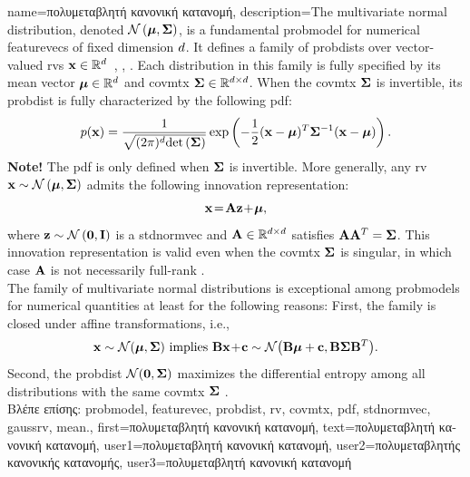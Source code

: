 {name={\foreignlanguage{greek}{πολυμεταβλητή κανονική κατανομή}}, 
	description={The multivariate normal distribution, 
 		denoted $\mathcal{N}\left({\bm \mu},{\bf \Sigma}\right)$, is a fundamental \gls{probmodel} 
 		for numerical \gls{featurevec}s of fixed dimension $d$. 
 		It defines a family of \gls{probdist}s over vector-valued \gls{rv}s
 		${\bf x} \in \mathbb{R}^{d}$~\cite{BertsekasProb}, \cite{GrayProbBook}, \cite{Lapidoth09}. 
 		Each distribution in this family is fully specified by its \gls{mean} vector 
 		${\bm \mu} \in \mathbb{R}^{d}$ and \gls{covmtx} ${\bf \Sigma} \in \mathbb{R}^{d \times d}$. 
 		When the \gls{covmtx} ${\bf \Sigma}$ is invertible, its \gls{probdist} is 
 		fully characterized by the following \gls{pdf}:
 		\[
 		p({\bf x}) = 
 		\frac{1}{\sqrt{(2\pi)^{d} {\rm det}\left( {\bf \Sigma} \right)}} 
 		\exp\left( -\frac{1}{2} 
 		({\bf x} - {\bm \mu})^T {\bf \Sigma}^{-1} 
 		({\bf x} - {\bm \mu}) \right).
 		\]
 		\textbf{Note!} The \gls{pdf} is only defined when ${\bf \Sigma}$ is invertible.
     		More generally, any \gls{rv} ${\bf x} \sim \mathcal{N}\left({\bm \mu},{\bf \Sigma}\right)$ 
     		admits the following innovation representation:
		\[{\bf x} \!=\! {\bf A} {\bf z} \!+\!{\bm \mu},
		\]
		where ${\bf z} \sim \mathcal{N}\left(\mathbf{0},\mathbf{I}\right)$ is a \gls{stdnormvec} 
		and ${\bf A} \in \mathbb{R}^{d \times d}$ satisfies ${\bf A} {\bf A}^T = {\bf \Sigma}$. 
		This innovation representation is valid even when the \gls{covmtx} ${\bf \Sigma}$ is singular, 
		in which case ${\bf A}$ is not necessarily full-rank \cite[Ch. 23]{Lapidoth2017}.\\ 
		The family of multivariate normal distributions is exceptional among \gls{probmodel}s for numerical 
		quantities at least for the following reasons: First, the family is closed under affine transformations, i.e., 
		\[ 
		{\bf x} \sim \mathcal{N}({\bm \mu},{\bf \Sigma}) \mbox{ implies } 
		{\bf B}{\bf x}\!+\!{\bf c} \sim \mathcal{N}\big( {\bf B}{\bm \mu}+{\bf c},{\bf B} {\bf \Sigma} {\bf B}^{T} \big). 
		\]
		Second, the \gls{probdist} $\mathcal{N}(\mathbf{0},{\bf \Sigma})$ maximizes the differential entropy 
		among all distributions with the same \gls{covmtx} ${\bf \Sigma}$ \cite{coverthomas}. \\ 
		\foreignlanguage{greek}{Βλέπε επίσης:} \gls{probmodel}, \gls{featurevec}, \gls{probdist}, \gls{rv}, \gls{covmtx}, \gls{pdf}, \gls{stdnormvec}, \gls{gaussrv}, \gls{mean}.}, 
		first={\foreignlanguage{greek}{πολυμεταβλητή κανονική κατανομή}},
		text={\foreignlanguage{greek}{πολυμεταβλητή κανονική κατανομή}},
		user1={\foreignlanguage{greek}{πολυμεταβλητή κανονική κατανομή}}, %
		user2={\foreignlanguage{greek}{πολυμεταβλητής κανονικής κατανομής}}, %
		user3={\foreignlanguage{greek}{πολυμεταβλητή κανονική κατανομή}} %
}

